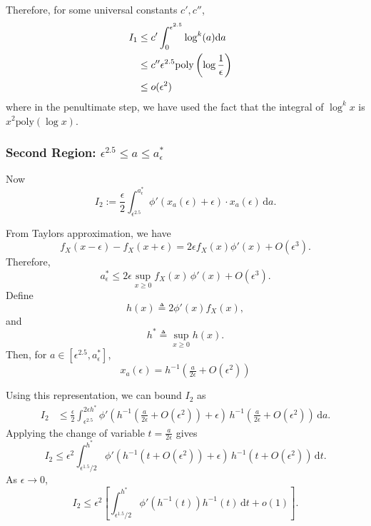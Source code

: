 \documentclass[10pt]{article} %
\theoremstyle{plain}
\theoremstyle{definition}
\theoremstyle{remark}
\newcommand{\dx}{\mathrm{d}}
\begin{document}
Therefore, for some universal constants $c',c''$,
\begin{align}
I_1&\leq c'\int_{0}^{\epsilon^{2.5}}\log^k(a)\dx a &\notag\\
&\leq c'' \epsilon^{2.5}\mathrm{poly}\left(\log \frac{1}{\epsilon}\right)&\notag\\
&\leq o(\epsilon^2)\label{eq:bound_I1}
\end{align}
where in the penultimate step, we have used the fact that the integral of $\log^k x$ is $x^2\mathrm{poly}(\log x)$. 
















\subsubsection*{Second Region: \( \epsilon^{2.5} \leq a \leq a_{\epsilon}^* \)}\label{part2:region1}
Now
\[
I_2 := \frac{\epsilon}{2} \int_{\epsilon^{2.5}}^{a_{\epsilon}^*} \phi'(x_a(\epsilon) + \epsilon) \cdot x_a(\epsilon) \, \dx a.
\]

From Taylors approximation, we have
\[
f_X(x-\epsilon)-f_X(x+\epsilon) = 2\epsilon f_X(x)\phi'(x) +O(\epsilon^3).
\]
Therefore,
\[
a_{\epsilon}^* \leq 2 \epsilon \sup_{x \geq 0} f_X(x)\,\phi'(x) + O(\epsilon^3).
\]
Define
\[
h(x) \triangleq 2\phi'(x) f_X(x),
\]
and
\[ 
h^* \triangleq \sup_{x \geq 0} h(x).
\]
Then, for \(a \in [\epsilon^{2.5}, a_{\epsilon}^*]\),
\[
x_a(\epsilon) = h^{-1} \left(\tfrac{a}{2\epsilon} + O(\epsilon^{2})\right)
\]

Using this representation, we can bound \(I_2\) as
\begin{align*}
I_2 &\leq \frac{\epsilon}{2} \int_{\epsilon^{2.5}}^{2\epsilon h^*} 
\phi' \left(h^{-1} \left(\tfrac{a}{2\epsilon} + O(\epsilon^2)\right) + \epsilon\right)
\, h^{-1} \left(\tfrac{a}{2\epsilon} + O(\epsilon^2)\right) \, \dx a.
\end{align*}
Applying the change of variable \(t = \tfrac{a}{2\epsilon}\) gives
\[
I_2 \leq \epsilon^2 \int_{\epsilon^{1.5}/2}^{h^*} 
\phi' \left(h^{-1}(t + O(\epsilon^2)) + \epsilon\right)
\, h^{-1}(t + O(\epsilon^2)) \, \dx t.
\]
As \(\epsilon \to 0\),
\begin{equation}\label{eq:bound_I2}
I_2 \leq \epsilon^2 \left[ \int_{\epsilon^{1.5}/2}^{h^*} \phi' \left(h^{-1}(t)\right) h^{-1}(t) \, \dx t + o(1) \right].
\end{equation}
\end{document}
